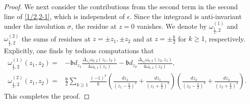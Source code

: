 \documentclass[12pt]{amsart}
\theoremstyle{plain}
\theoremstyle{definition}
\theoremstyle{remark}
\numberwithin{equation}{section}
\begin{document}
\begin{proof}
We next consider the contributions from the second term in the second line of \eqref{1/2,2-1}, which is independent of $\epsilon$. Since the integrand is anti-invariant under the involution $\sigma$, the residue at $z=0$ vanishes. We denote by $\omega_{\frac12,2}^{(1)}$ and $\omega_{\frac12,2}^{(2)}$ the sums of residues at $z=\pm z_1,\pm z_2$ and at $z=\pm\frac{k}{2}$ for $k\geq1$, respectively. Explicitly, one finds by tedious computations that
\begin{align*}
   \omega_{\frac12,2}^{(1)}(z_1,z_2)=&-\mathfrak{b}d_{z_1}\frac{\Delta_{z_1}\omega_{0,2}(z_1,z_2)}{4\omega_{0,1}(z_1)}-\mathfrak{b}d_{z_2}\frac{\Delta_{z_2}\omega_{0,2}(z_2,z_1)}{4\omega_{0,1}(z_2)},\\
     \omega_{\frac12,2}^{(2)}(z_1,z_2)=&\frac{\mathfrak{b}}{2}\sum_{k\geq1}\frac{(-1)^k}{k}\left(\frac{dz_1}{(z_1-\frac{k}{2})^2}+\frac{dz_1}{(z_1+\frac{k}{2})^2}\right)\left(\frac{dz_2}{(z_2-\frac{k}{2})^2}+\frac{dz_2}{(z_2+\frac{k}{2})^2}\right).
\end{align*}
This completes the proof.
\end{proof}

\end{document}
